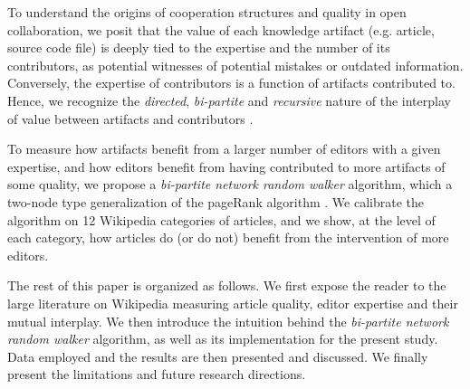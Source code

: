 To understand the origins of cooperation structures and quality in open collaboration, we posit that the value of each knowledge artifact (e.g. article, source code file) is deeply tied to the expertise and the number of its contributors, as potential witnesses of potential mistakes or outdated information. Conversely, the expertise of contributors is a function of artifacts contributed to.  Hence, we recognize the {\it directed}, {\it bi-partite} and {\it recursive} nature of the interplay of value between artifacts and contributors \cite{kane2009}.

To measure how artifacts benefit from a larger number of editors with a given expertise, and how editors benefit from having contributed to more artifacts of some quality, we propose a {\it bi-partite network random walker} algorithm, which a two-node type generalization of the pageRank algorithm \cite{page1999pagerank}. We calibrate the algorithm on 12 Wikipedia categories of articles, and we show, at the level of each category, how articles do (or do not) benefit from the intervention of more editors. 

The rest of this paper is organized as follows. We first expose the reader to the large literature on Wikipedia measuring article quality, editor expertise and their mutual interplay. We then introduce the intuition behind the {\it bi-partite network random walker} algorithm, as well as its implementation for the present study. Data employed and the results are then presented and discussed. We finally present the limitations and future research directions.
